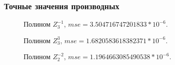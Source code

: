 \documentclass{article}
\begin{document}
\subsubsection{Точные значения производных}
\begin{figure}[H]
\caption{Полином $Z_3^{-1}$, $mse =3.504716747201833*10^{-6}$.}
\end{figure}
\begin{figure}[H]
\caption{Полином $Z_3^{3}$, $mse =1.6820583618382371*10^{-6}$.}
\end{figure}
\begin{figure}[H]
\caption{Полином $Z_2^{-2}$, $mse =1.1964663085490538*10^{-6}$.}
\end{figure}
\end{document}

